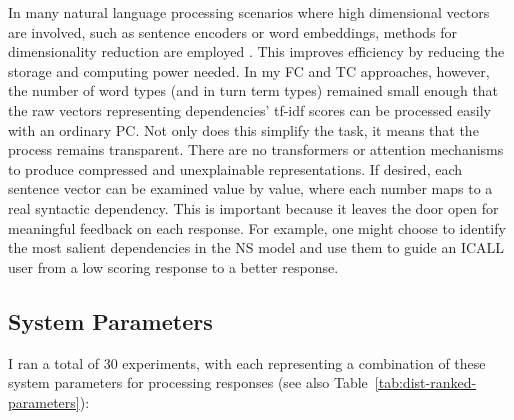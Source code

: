 In many natural language processing scenarios where high dimensional vectors are involved, such as sentence encoders or word embeddings, methods for dimensionality reduction are employed \citep{BertDevlin2018,word2vec}. This improves efficiency by reducing the storage and computing power needed. In my FC and TC approaches, however, the number of word types (and in turn term types) remained small enough that the raw vectors representing dependencies' tf-idf scores can be processed easily with an ordinary PC. Not only does this simplify the task, it means that the process remains transparent. There are no transformers or attention mechanisms to produce compressed and unexplainable representations.  If desired, each sentence vector can be examined value by value, where each number maps to a real syntactic dependency. This is important because it leaves the door open for meaningful feedback on each response. For example, one might choose to identify the most salient dependencies in the NS model and use them to guide an ICALL user from a low scoring response to a better response.

\subsection{System Parameters}
\label{sec:parameters}

I ran a total of 30 experiments, with each representing a combination of these system parameters for processing responses (see also Table~\ref{tab:dist-ranked-parameters}): 

